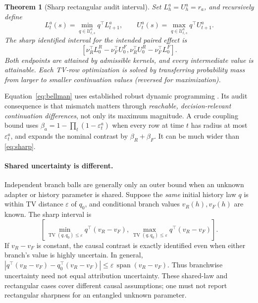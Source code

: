 \documentclass{article}
\newtheorem{theorem}{Theorem}
\theoremstyle{definition}
\newcommand{\TV}{\operatorname{TV}}
\newcommand{\eps}{\varepsilon}
\newcommand{\cU}{\mathcal U}
\begin{document}
\begin{theorem}[Sharp rectangular audit interval]\label{thm:rectangular}
Set $L_h^a=U_h^a=r_a$, and recursively define
\begin{equation}
 L_t^a(s)=\min_{q\in\cU_{t,s}^a}q^\top L_{t+1}^a,
 \qquad U_t^a(s)=\max_{q\in\cU_{t,s}^a}q^\top U_{t+1}^a.\label{eq:bellman}
\end{equation}
The sharp identified interval for the intended paired effect is
\begin{equation}
 \left[\nu_R^\top L_0^R-\nu_F^\top U_0^F,
       \nu_R^\top U_0^R-\nu_F^\top L_0^F\right].\label{eq:sharp}
\end{equation}
Both endpoints are attained by admissible kernels, and every intermediate value is attainable. Each TV-row optimization is solved by transferring probability mass from larger to smaller continuation values (reversed for maximization).
\end{theorem}
Equation~\eqref{eq:bellman} uses established robust dynamic programming \citep{nilim}. Its audit consequence is that mismatch matters through \emph{reachable, decision-relevant continuation differences}, not only its maximum magnitude. A crude coupling bound uses $\beta_a=1-\prod_t(1-\eps_t^a)$ when every row at time $t$ has radius at most $\eps_t^a$, and expands the nominal contrast by $\beta_R+\beta_F$. It can be much wider than \eqref{eq:sharp}.

\paragraph{Shared uncertainty is different.}
Independent branch balls are generally only an outer bound when an unknown adapter or history parameter is shared. Suppose the \emph{same} initial history law $q$ is within TV distance $\eps$ of $q_0$, and conditional branch values $v_R(h),v_F(h)$ are known. The sharp interval is
\begin{equation}
 \left[\min_{\TV(q,q_0)\leq\eps}q^\top(v_R-v_F),
       \max_{\TV(q,q_0)\leq\eps}q^\top(v_R-v_F)\right].\label{eq:shared}
\end{equation}
If $v_R-v_F$ is constant, the causal contrast is exactly identified even when either branch's value is highly uncertain. In general,
$|q^\top(v_R-v_F)-q_0^\top(v_R-v_F)|\leq\eps\,\operatorname{span}(v_R-v_F)$.
Thus branchwise uncertainty need not equal attribution uncertainty. These shared-law and rectangular cases cover different causal assumptions; one must not report rectangular sharpness for an entangled unknown parameter.
\end{document}
